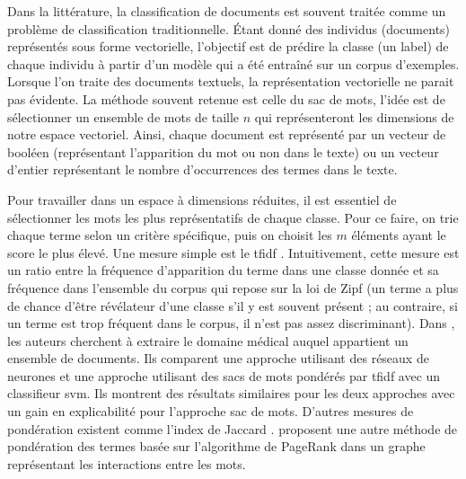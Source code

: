 Dans la littérature, la classification de documents est souvent traitée comme un problème de classification traditionnelle.
Étant donné des individus (documents) représentés sous forme vectorielle, l'objectif est de prédire la classe (un label) de chaque individu à partir d'un modèle qui a été entraîné sur un corpus d'exemples.
Lorsque l'on traite des documents textuels, la représentation vectorielle ne parait pas évidente.
La méthode souvent retenue est celle du sac de mots, l'idée est de sélectionner un ensemble de mots de taille $n$ qui représenteront les dimensions de notre espace vectoriel.
Ainsi, chaque document est représenté par un vecteur de booléen (représentant l'apparition du mot ou non dans le texte) ou un vecteur d'entier représentant le nombre d'occurrences des termes dans le texte.

Pour travailler dans un espace à dimensions réduites, il est essentiel de sélectionner les mots les plus représentatifs de chaque classe.
Pour ce faire, on trie chaque terme selon un critère spécifique, puis on choisit les $m$ éléments ayant le score le plus élevé.
Une mesure simple est le \gls{tfidf} \cite{sparckjonesStatisticalInterpretationTerm1972}.
Intuitivement, cette mesure est un ratio entre la fréquence d'apparition du terme dans une classe donnée et sa fréquence dans l'ensemble du corpus qui repose sur la loi de Zipf \cite{zipfPsychobiologyLanguage1935} (un terme a plus de chance d'être révélateur d'une classe s'il y est souvent présent ; au contraire, si un terme est trop fréquent dans le corpus, il n'est pas assez discriminant).
Dans \cite{wengMedicalSubdomainClassification2017}, les auteurs cherchent à extraire le domaine médical auquel appartient un ensemble de documents.
Ils comparent une approche utilisant des réseaux de neurones et une approche utilisant des sacs de mots pondérés par \gls{tfidf} avec un classifieur \gls{svm}.
Ils montrent des résultats similaires pour les deux approches avec un gain en explicabilité pour l'approche sac de mots.
D'autres mesures de pondération existent comme l'index de Jaccard \cite{jaccardDistributionFloreAlpine1901}.
\cite{mihalceaTextrankBringingOrder2004} proposent une autre méthode de pondération des termes basée sur l'algorithme de PageRank \cite{brinAnatomyLargescaleHypertextual1998} dans un graphe représentant les interactions entre les mots.

